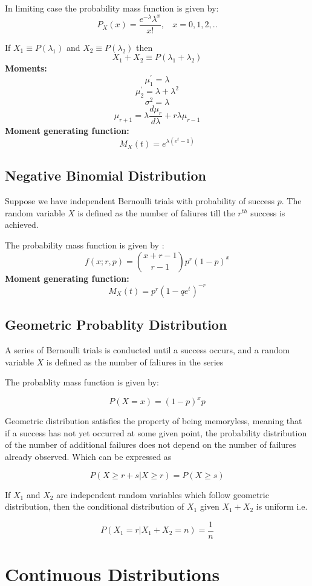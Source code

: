 \documentclass{article}
\begin{document}
In limiting case the probability mass function is given by:
$$
P_X(x) = \frac{e^{-\lambda}\lambda^{x}}{x!} ,~~~~ x=0,1,2,..
$$


If $X_1\equiv P(\lambda_1)$ and $X_2 \equiv P(\lambda_2)$ then 
$$
X_1+X_2 \equiv P(\lambda_1+\lambda_2)
$$
\textbf{Moments:}
$$\mu_1^\prime=\lambda$$
$$\mu_2^\prime=\lambda+\lambda^2$$
$$\sigma^2=\lambda$$ 
$$\mu_{r+1}=\lambda\frac{d\mu_r}{d\lambda}+r\lambda\mu_{r-1}$$
\textbf{Moment generating function:} $$M_X(t)=e^{\lambda (e^t-1)}$$

\subsection{Negative Binomial Distribution}
Suppose we have independent Bernoulli trials with probability of success $p$. The random variable $X$ is defined as the number of faliures till the $r^{th}$ success is achieved.

The probability mass function is given by :
$$
f(x;r,p)=\binom{x+r-1}{r-1}p^r(1-p)^x
$$
\textbf{Moment generating function:} $$M_X(t)=p^r(1-qe^t)^{-r}$$

\subsection{Geometric Probablity Distribution}
A series of Bernoulli trials is conducted until a success occurs, and a random variable $X$ is defined as the number of faliures in the series

The probablity mass function is given by: 

$$P(X=x)=(1-p)^{x}p$$

Geometric distribution satisfies the property of being memoryless, meaning that if a success has not yet occurred at some given point, the probability distribution of the number of additional failures does not depend on the number of failures already observed. Which can be expressed as

$$P(X \geq r+s|X \geq r)=P(X \geq s)$$

If $X_1$ and $X_2$ are independent random variables which follow geometric distribution, then the conditional distribution of $X_1$ given $ X_1 + X_2 $ is uniform i.e.

$$P(X_1=r | X_1 + X_2 = n) = \frac{1}{n}$$

\section{Continuous Distributions}
\end{document}
